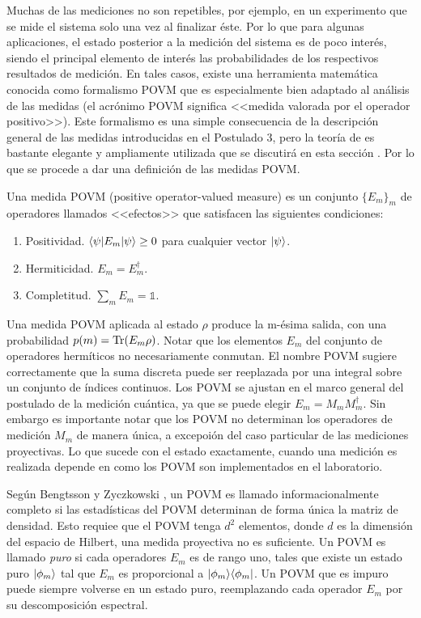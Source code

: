 Muchas de las mediciones no son repetibles, por ejemplo, en un experimento que se mide el sistema solo una vez al finalizar éste. Por lo que para algunas aplicaciones, el estado posterior a la medición del sistema es de poco interés, siendo el principal elemento de interés las probabilidades de los respectivos resultados de medición. En tales casos, existe una herramienta matemática conocida como formalismo POVM que es especialmente bien adaptado al análisis de las medidas (el acrónimo POVM significa <<medida valorada por el operador positivo>>). Este formalismo es una simple consecuencia de la descripción general de las medidas introducidas en el Postulado 3, pero la teoría de es bastante elegante y ampliamente utilizada que se discutirá en esta sección {\cite{nielsen_chuang_2010}}. Por lo que se procede a dar una definición de las medidas POVM\@.

\begin{definition} Una medida POVM (positive operator-valued measure) es un conjunto $\{E_{m}\} _{m}$ de operadores llamados <<efectos>> que satisfacen las siguientes condiciones:
	\begin{enumerate}
		\item Positividad. $\langle \psi |E_m|\psi \rangle \ge 0 $ para cualquier vector $|\psi\rangle$.
		\item Hermiticidad. $E_m=E_{m}^\dagger$.
		\item  Completitud. $\sum_m E_m =\mathds{1}$.
	\end{enumerate}
\end{definition}

Una medida POVM aplicada al estado $\rho$ produce la m-ésima salida, con una probabilidad $p(m)={\rm Tr}(E_m \rho)$. Notar que los elementos $E_m$ del conjunto de operadores hermíticos no necesariamente conmutan. El nombre POVM sugiere correctamente que la suma discreta puede ser reeplazada por una integral sobre un conjunto de índices continuos. Los POVM se ajustan en el marco general del postulado de la medición cuántica, ya que se puede elegir $E_m=M_m M_m^{\dagger}$. Sin embargo es importante notar que los POVM no determinan los operadores de medición $M_m$ de manera única, a excepoión del caso particular de las mediciones proyectivas. Lo que sucede con el estado exactamente, cuando una medición es realizada depende en como los POVM son implementados en el laboratorio{\cite{2007geometry}}.   

Según Bengtsson y Zyczkowski {\cite{2007geometry}}, un POVM es llamado informacionalmente completo si las estadísticas del POVM determinan de forma única la matriz de densidad. Esto requiee que el POVM tenga $d^2$ elementos, donde $d$ es la dimensión del espacio de Hilbert, una medida proyectiva no es suficiente. Un POVM es llamado \textit{puro} si cada operadores $E_m$ es de rango uno, tales que existe un estado puro $|\phi_m\rangle$ tal que $E_m$ es proporcional a $|\phi_m\rangle \langle\phi_m|$. Un POVM que es impuro puede siempre volverse en un estado puro, reemplazando cada operador $E_m$ por su descomposición espectral. 

